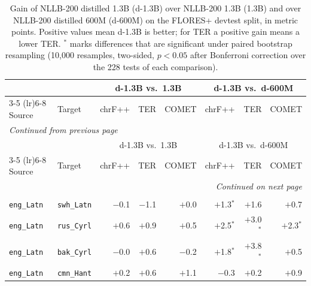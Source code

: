 \begingroup
\footnotesize
\setlength{\tabcolsep}{3pt}
\setlength{\LTleft}{0pt plus 1fill minus 1fill}
\setlength{\LTright}{0pt plus 1fill minus 1fill}
\setlength{\LTcapwidth}{\textwidth}
\renewcommand{\tablename}{\normalsize Table}
\begin{longtable}{@{}ll rrr rrr@{}}
\toprule
 & & \multicolumn{3}{c}{d-1.3B vs.\ 1.3B} & \multicolumn{3}{c}{d-1.3B vs.\ d-600M} \\
\cmidrule(lr){3-5} \cmidrule(lr){6-8}
Source & Target & chrF++ & TER & COMET & chrF++ & TER & COMET \\
\midrule
\endfirsthead
\multicolumn{8}{l}{\textit{Continued from previous page}} \\
\toprule
 & & \multicolumn{3}{c}{d-1.3B vs.\ 1.3B} & \multicolumn{3}{c}{d-1.3B vs.\ d-600M} \\
\cmidrule(lr){3-5} \cmidrule(lr){6-8}
Source & Target & chrF++ & TER & COMET & chrF++ & TER & COMET \\
\midrule
\endhead
\midrule
\multicolumn{8}{r}{\textit{Continued on next page}} \\
\endfoot
\bottomrule
\addlinespace[\abovecaptionskip]
\caption{Gain of NLLB-200 distilled 1.3B (d-1.3B) over NLLB-200 1.3B (1.3B) and over NLLB-200 distilled 600M (d-600M) on the FLORES+ devtest split, in metric points. Positive values mean d-1.3B is better; for TER a positive gain means a lower TER. $^{*}$ marks differences that are significant under paired bootstrap resampling (10{,}000 resamples, two-sided, $p < 0.05$ after Bonferroni correction over the 228 tests of each comparison).}
\label{tab:significance-directions} \\
\endlastfoot
\texttt{eng\_Latn} & \texttt{swh\_Latn} & $-$0.1\phantom{$^{*}$} & $-$1.1\phantom{$^{*}$} & $+$0.0\phantom{$^{*}$} & $+$1.3$^{*}$ & $+$1.6\phantom{$^{*}$} & $+$0.7\phantom{$^{*}$} \\
\texttt{eng\_Latn} & \texttt{rus\_Cyrl} & $+$0.6\phantom{$^{*}$} & $+$0.9\phantom{$^{*}$} & $+$0.5\phantom{$^{*}$} & $+$2.5$^{*}$ & $+$3.0$^{*}$ & $+$2.3$^{*}$ \\
\texttt{eng\_Latn} & \texttt{bak\_Cyrl} & $-$0.0\phantom{$^{*}$} & $+$0.6\phantom{$^{*}$} & $-$0.2\phantom{$^{*}$} & $+$1.8$^{*}$ & $+$3.8$^{*}$ & $+$0.5\phantom{$^{*}$} \\
\texttt{eng\_Latn} & \texttt{cmn\_Hant} & $+$0.2\phantom{$^{*}$} & $+$0.6\phantom{$^{*}$} & $+$1.1\phantom{$^{*}$} & $-$0.3\phantom{$^{*}$} & $+$0.2\phantom{$^{*}$} & $+$0.9\phantom{$^{*}$} \\

\end{longtable}
